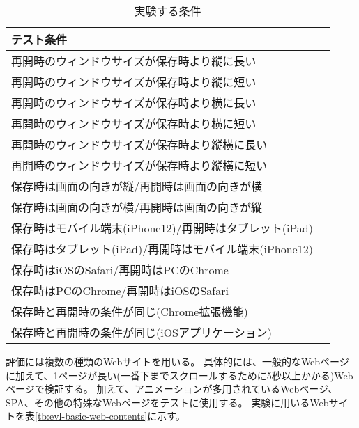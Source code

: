 \begin{table}[htbp]
  \label{tb:evl-scroll-position}
  \caption{実験する条件}
  \begin{center}
    \begin{tabular}{|l|l|}
    \hline
    テスト条件  \\ \hline
    再開時のウィンドウサイズが保存時より縦に長い  \\ \hline
    再開時のウィンドウサイズが保存時より縦に短い  \\ \hline
    再開時のウィンドウサイズが保存時より横に長い  \\ \hline
    再開時のウィンドウサイズが保存時より横に短い  \\ \hline
    再開時のウィンドウサイズが保存時より縦横に長い  \\ \hline
    再開時のウィンドウサイズが保存時より縦横に短い  \\ \hline
    保存時は画面の向きが縦/再開時は画面の向きが横 \\ \hline
    保存時は画面の向きが横/再開時は画面の向きが縦 \\ \hline
    保存時はモバイル端末(iPhone12)/再開時はタブレット(iPad) \\ \hline
    保存時はタブレット(iPad)/再開時はモバイル端末(iPhone12) \\ \hline
    保存時はiOSのSafari/再開時はPCのChrome \\ \hline
    保存時はPCのChrome/再開時はiOSのSafari \\ \hline
    保存時と再開時の条件が同じ(Chrome拡張機能) \\ \hline
    保存時と再開時の条件が同じ(iOSアプリケーション) \\ \hline
    \end{tabular}
  \end{center}
\end{table}

評価には複数の種類のWebサイトを用いる。
具体的には、一般的なWebページに加えて、1ページが長い(一番下までスクロールするために5秒以上かかる)Webページで検証する。
加えて、アニメーションが多用されているWebページ、SPA、その他の特殊なWebページをテストに使用する。
実験に用いるWebサイトを表\ref{tb:evl-basic-web-contents}に示す。

